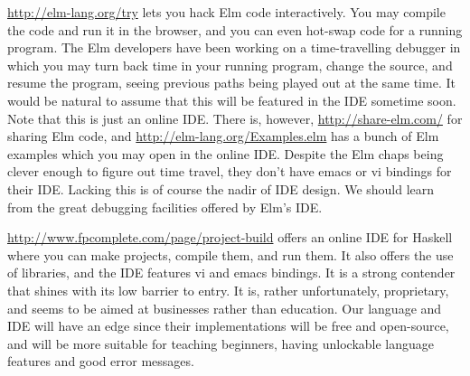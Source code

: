 \url{http://elm-lang.org/try} lets you hack Elm code interactively. You may
compile the code and run it in the browser, and you can even hot-swap code for
a running program. The Elm developers have been working on a time-travelling
debugger in which you may turn back time in your running program, change the
source, and resume the program, seeing previous paths being played out at the
same time. It would be natural to assume that this will be featured in the IDE
sometime soon.  Note that this is just an online IDE.  There is, however,
\url{http://share-elm.com/} for sharing Elm code, and
\url{http://elm-lang.org/Examples.elm} has a bunch of Elm examples which you
may open in the online IDE. Despite the Elm chaps being clever enough to figure
out time travel, they don't have emacs or vi bindings for their IDE. Lacking
this is of course the nadir of IDE design. We should learn from the great 
debugging facilities offered by Elm's IDE.

\url{http://www.fpcomplete.com/page/project-build} offers an online IDE for
Haskell where you can make projects, compile them, and run them. It also
offers the use of libraries, and the IDE features vi and emacs bindings.  It is
a strong contender that shines with its low barrier to entry. It is, rather
unfortunately, proprietary, and seems to be aimed at businesses rather than
education. Our language and IDE will have an edge since their implementations
will be free and open-source, and will be more suitable for teaching beginners,
having unlockable language features and good error messages.
